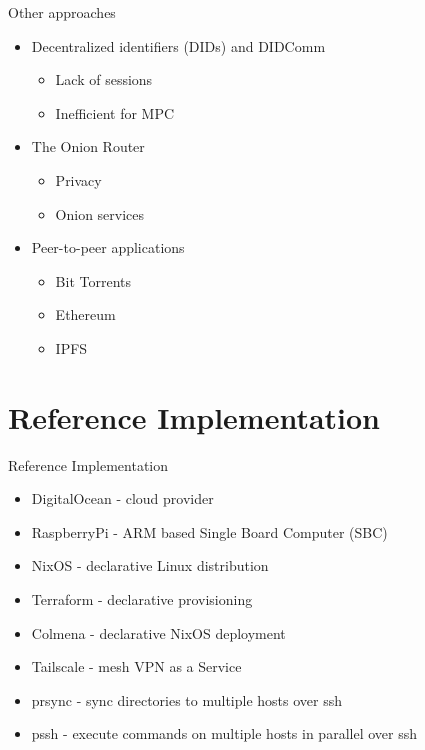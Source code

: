 \begin{frame}{Other approaches}
\protect\hypertarget{other-approaches}{}
\begin{itemize}
\tightlist
\item
  Decentralized identifiers (DIDs) and DIDComm

  \begin{itemize}
  \tightlist
  \item
    Lack of sessions
  \item
    Inefficient for MPC
  \end{itemize}
\item
  The Onion Router

  \begin{itemize}
  \tightlist
  \item
    Privacy
  \item
    Onion services
  \end{itemize}
\item
  Peer-to-peer applications

  \begin{itemize}
  \tightlist
  \item
    Bit Torrents
  \item
    Ethereum
  \item
    IPFS
  \end{itemize}
\end{itemize}
\end{frame}

\begin{frame}{}
\protect\hypertarget{section}{}
\section{Reference Implementation}
\end{frame}

\begin{frame}{Reference Implementation}
\protect\hypertarget{reference-implementation}{}
\begin{itemize}
\tightlist
\item
  DigitalOcean - cloud provider
\item
  RaspberryPi - ARM based Single Board Computer (SBC)
\item
  NixOS - declarative Linux distribution
\item
  Terraform - declarative provisioning
\item
  Colmena - declarative NixOS deployment
\item
  Tailscale - mesh VPN as a Service
\item
  prsync - sync directories to multiple hosts over ssh
\item
  pssh - execute commands on multiple hosts in parallel over ssh
\end{itemize}
\end{frame}

